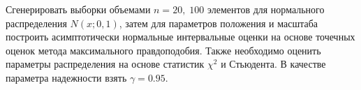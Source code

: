 {Сгенерировать выборки объемами $n = 20, \; 100$ элементов для нормального распределения $N(x; 0, 1)$, затем для параметров положения и масштаба построить асимптотически нормальные интервальные оценки на основе точечных оценок метода максимального правдоподобия. Также необходимо оценить параметры распределения на основе статистик $\chi^2$ и Стьюдента. В качестве параметра надежности взять $\gamma = 0.95$.}
